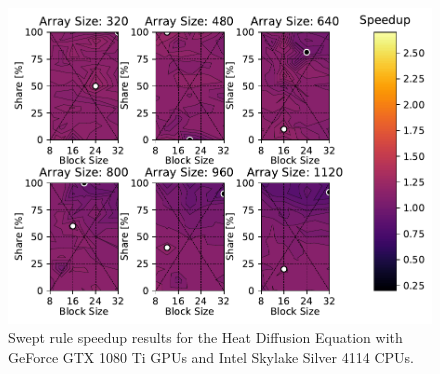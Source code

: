 \documentclass[mca,article,submit,moreauthors,pdftex]{Definitions/mdpi}
\def\oldCPU{Intel Skylake Silver 4114} %
\def\oldGPU{GeForce GTX 1080 Ti}
\begin{document}
\begin{figure}[htbp]
    \widefigure
    \includegraphics[scale=0.85]{figs/SpeedupTPTheatOld.pdf}
    \caption{Swept rule speedup results for the Heat Diffusion Equation with \oldGPU{} GPUs and \oldCPU{} CPUs.}
    \label{fig:oldSpeedupHeat} 
\end{figure}

\begin{paracol}{2}
\linenumbers
\switchcolumn



\end{paracol}
\nointerlineskip
\end{document}
